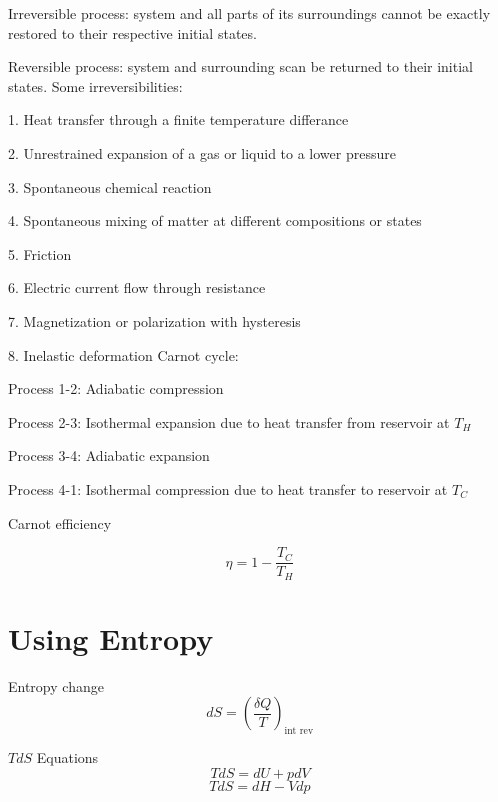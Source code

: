 \documentclass[paper=letter, fontsize=11pt]{scrartcl}
\numberwithin{equation}{section}        %
\numberwithin{figure}{section}          %
\numberwithin{table}{section}               %
\begin{document}
Irreversible process: system and all parts of its surroundings cannot be exactly restored to their respective initial states.

Reversible process: system and surrounding scan be returned to their initial states.
\newline
\newline
Some irreversibilities:

1. Heat transfer through a finite temperature differance

2. Unrestrained expansion of a gas or liquid to a lower pressure

3. Spontaneous chemical reaction

4. Spontaneous mixing of matter at different compositions or states

5. Friction

6. Electric current flow through resistance

7. Magnetization or polarization with hysteresis

8. Inelastic deformation
\newline
\newline
Carnot cycle:

Process 1-2: Adiabatic compression

Process 2-3: Isothermal expansion due to heat transfer from reservoir at $T_H$

Process 3-4: Adiabatic expansion

Process 4-1: Isothermal compression due to heat transfer to reservoir at $T_C$

Carnot efficiency

\begin{equation}
    \eta = 1 - \frac{T_C}{T_H}
\end{equation}

\newpage
\section{Using Entropy}

Entropy change
\begin{equation}
    d S = \left(\frac{\delta Q}{T}\right)_\text{int rev}
\end{equation}

$TdS$ Equations
\begin{equation}
    T dS = dU + p dV
\end{equation}
\begin{equation}
    T dS = dH - V dp
\end{equation}
\end{document}
